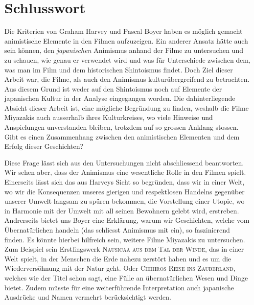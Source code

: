 \section*{Schlusswort}
Die Kriterien von Graham Harvey und Pascal Boyer haben es möglich gemacht animistische Elemente in den Filmen aufzuzeigen. Ein anderer Ansatz hätte auch sein können, den \emph{japanischen} Animismus anhand der Filme zu untersuchen und zu schauen, wie genau er verwendet wird und was für Unterschiede zwischen dem, was man im Film und dem historischen Shintoismus findet. Doch Ziel dieser Arbeit war, die Filme, als auch den Animismus kulturübergreifend zu betrachten. Aus diesem Grund ist weder auf den Shintoismus noch auf Elemente der japanischen Kultur in der Analyse eingegangen worden. Die dahinterliegende Absicht dieser Arbeit ist, eine mögliche Begründung zu finden, weshalb die Filme Miyazakis auch ausserhalb ihres Kulturkreises, wo viele Hinweise und Anspielungen unverstanden bleiben, trotzdem auf so grossen Anklang stossen. Gibt es einen Zusammenhang zwischen den animistischen Elementen und dem Erfolg dieser Geschichten?

Diese Frage lässt sich aus den Untersuchungen nicht abschliessend beantworten. Wir sehen aber, dass der Animismus eine wesentliche Rolle in den Filmen spielt. Einerseits lässt sich das aus Harveys Sicht so begründen, dass wir in einer Welt, wo wir die Konsequenzen unseres gierigen und respektlosen Handelns gegenüber unserer Umwelt langsam zu spüren bekommen, die Vorstellung einer Utopie, wo in Harmonie mit der Umwelt mit all seinen Bewohnern gelebt wird, erstreben. Andrerseits bietet uns Boyer eine Erklärung, warum wir Geschichten, welche vom Übernatürlichen handeln (das schliesst Animismus mit ein), so faszinierend finden. Es könnte hierbei hilfreich sein, weitere Filme Miyazakis zu untersuchen. Zum Beispiel sein Erstlingswerk \textsc{Nausicaä aus dem Tal der Winde}, das in einer Welt spielt, in der Menschen die Erde nahezu zerstört haben und es um die Wiederversöhnung mit der Natur geht. Oder \textsc{Chihiros Reise ins Zauberland}, welches wie der Titel schon sagt, eine Fülle an übernatürlichen Wesen und Dinge bietet. Zudem müsste für eine weiterführende Interpretation auch japanische Ausdrücke und Namen vermehrt berücksichtigt werden.